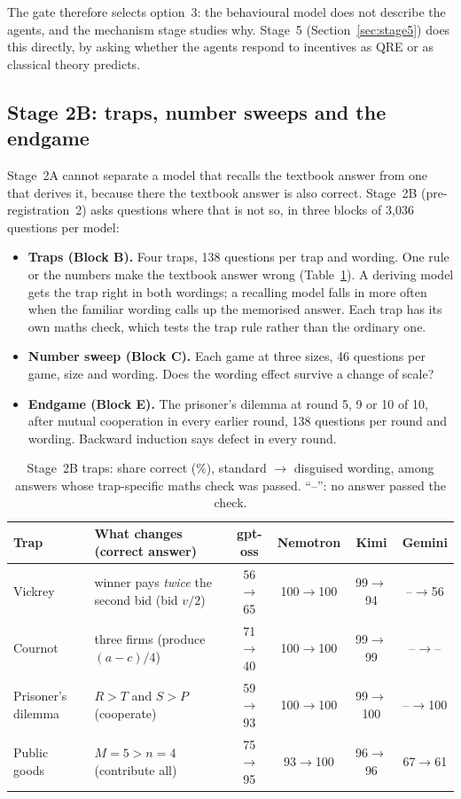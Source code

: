 \documentclass[10pt]{article}
\theoremstyle{definition}
\theoremstyle{remark}
\begin{document}
The gate therefore selects option~3: the behavioural model does not describe the agents, and the
mechanism stage studies why. Stage~5 (Section~\ref{sec:stage5}) does this directly, by asking
whether the agents respond to incentives as QRE or as classical theory predicts.

\subsection{Stage 2B: traps, number sweeps and the endgame}\label{sec:stage2b}
Stage~2A cannot separate a model that recalls the textbook answer from one that derives it,
because there the textbook answer is also correct. Stage~2B (pre-registration~2) asks questions
where that is not so, in three blocks of 3{,}036 questions per model:
\begin{itemize}
\item \textbf{Traps (Block B).} Four traps, 138 questions per trap and wording. One rule or the
  numbers make the textbook answer wrong
  (Table~\ref{tab:traps}). A deriving model gets the trap right in both wordings; a recalling
  model falls in more often when the familiar wording calls up the memorised answer. Each trap
  has its own maths check, which tests the trap rule rather than the ordinary one.
\item \textbf{Number sweep (Block C).} Each game at three sizes, 46 questions per game, size and
  wording. Does the wording effect
  survive a change of scale?
\item \textbf{Endgame (Block E).} The prisoner's dilemma at round 5, 9 or 10 of 10, after
  mutual cooperation in every earlier round, 138 questions per round and wording. Backward induction says defect in every round.
\end{itemize}

\begin{table}[t]
\centering
\caption{Stage~2B traps: share correct (\%), standard $\to$ disguised wording, among answers
whose trap-specific maths check was passed. ``--'': no answer passed the check.}
\label{tab:traps}
\small
\begin{tabular}{@{}>{\raggedright}p{2.0cm}>{\raggedright\arraybackslash}p{4.3cm}cccc@{}}
\toprule
Trap & What changes (correct answer) & gpt-oss & Nemotron & Kimi & Gemini \\
\midrule
Vickrey & winner pays \emph{twice} the second bid (bid $v/2$) & 56$\to$65 & 100$\to$100 & 99$\to$94 & --$\to$56 \\
Cournot & three firms (produce $(a-c)/4$) & 71$\to$40 & 100$\to$100 & 99$\to$99 & --$\to$-- \\
Prisoner's dilemma & $R>T$ and $S>P$ (cooperate) & 59$\to$93 & 100$\to$100 & 99$\to$100 & --$\to$100 \\
Public goods & $M=5>n=4$ (contribute all) & 75$\to$95 & 93$\to$100 & 96$\to$96 & 67$\to$61 \\
\bottomrule
\end{tabular}
\end{table}
\end{document}
